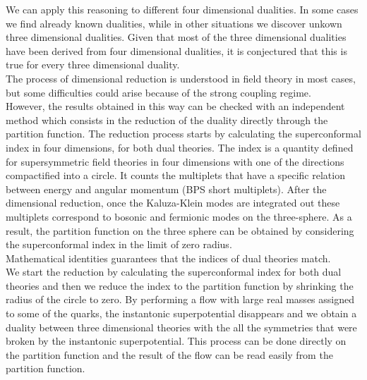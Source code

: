 We can apply this reasoning to different four dimensional dualities. 
In some cases we find already known dualities, while in other situations we discover unkown three dimensional dualities. 
Given that most of the three dimensional dualities have been derived from four dimensional dualities, it is conjectured that this is true for every three dimensional duality.\\

The process of dimensional reduction is understood in field theory in most cases, but some difficulties could arise because of the strong coupling regime.\\
However, the results obtained in this way can be checked with an independent method which consists in the reduction of the duality directly through the partition function.
The reduction process starts by calculating the superconformal index in four dimensions, for both dual theories. 
The index is a quantity defined for supersymmetric field theories in four dimensions with one of the directions compactified into a circle.
It counts the multiplets that have a specific relation between energy and angular momentum (BPS short multiplets). 
After the dimensional reduction, once the Kaluza-Klein modes are integrated out these multiplets correspond to bosonic and fermionic modes on the three-sphere.  
As a result, the partition function on the three sphere can be obtained by considering the superconformal index in the limit of zero radius.\\
Mathematical identities guarantees that the indices of dual theories match.\\

We start the reduction by calculating the superconformal index for both dual theories and then we reduce the index to the partition function by shrinking the radius of the circle to zero.
By performing a flow with large real masses assigned to some of the quarks, the instantonic superpotential disappears and we obtain a duality between three dimensional theories with the all the symmetries that were broken by the instantonic superpotential.
This process can be done directly on the partition function and the result of the flow can be read easily from the partition function.\\

